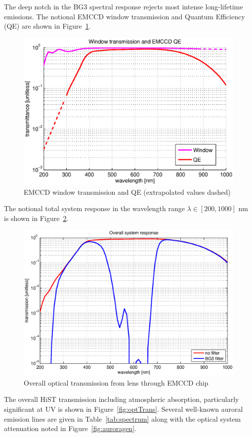 The deep notch in the BG3 spectral response rejects most intense long-lifetime emissions. 
The notional EMCCD window transmission and Quantum Efficiency (QE) are shown in Figure~\ref{fig:EMCCDwindQE}.
\begin{figure}\centering
	\includegraphics[width=\textwidth]{gfx/EMCCDwindowQELog}
	\caption{EMCCD window transmission and QE (extrapolated values dashed)}\label{fig:EMCCDwindQE}
\end{figure}  
The notional total system response in the wavelength range $\lambda \in [200,1000]$ nm is shown in Figure~\ref{fig:systemSpectralResp}.
\begin{figure}\centering
	\includegraphics[width=\textwidth]{gfx/EMCCDoverallTlog}
	\caption{Overall optical transmission from lens through EMCCD chip}\label{fig:systemSpectralResp}
\end{figure}
The overall HiST transmission including atmospheric absorption, particularly significant at UV is shown in Figure~\ref{fig:optTrans}.
Several well-known auroral emission lines are given in Table~\ref{tab:spectrum} along with the optical system attenuation noted in Figure~\ref{fig:auroragen}. 

